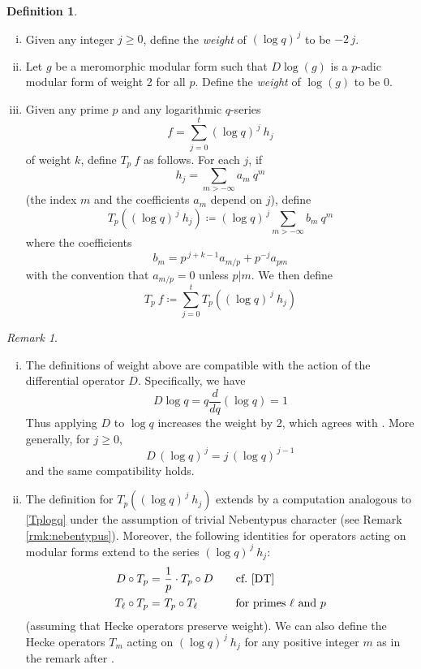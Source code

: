 \documentclass{gtpart}
\theoremstyle{definition}
\newtheorem{defn}[thm]{Definition}
\theoremstyle{remark}
\newtheorem{rmk}[thm]{Remark}
\newcommand{\ce}{\coloneqq}
\renewcommand{\=}{\approx}
\renewcommand{\-}{\sim}
\numberwithin{equation}{section}
\numberwithin{thm}{section}
\begin{document}
\begin{defn}
 \label{def:logq}
 \mbox{}
 \begin{enumerate}[(i)]
  \item Given any integer $j \geq 0$, define the {\em weight} of 
  $(\log q)^{\,j}$ to be $-2\,j$.  

  \item \label{ii} Let $g$ be a meromorphic modular form such that $D \log(g)$ 
  is a $p$-adic modular form of weight 2 for all $p$.  Define the {\em weight} 
  of $\log(g)$ to be 0.  

  \item \label{iii} Given any prime $p$ and any logarithmic $q$-series 
  \[
   f = \sum_{j = 0}^t (\log q)^{\,j} ~\! h_j 
  \]
  of weight $k$, define $T_p~f$ as follows.  For each $j$, if 
  \[
   h_j = \sum_{m > -\infty} a_m ~\! q^m 
  \]
  (the index $m$ and the coefficients $a_m$ depend on $j$), define 
  \[
   T_p \! \left( (\log q)^{\,j} ~\! h_j \right) \ce (\log q)^{\,j} 
   \sum_{m > -\infty} b_m ~\! q^m 
  \]
  where the coefficients 
  \[
   b_m = p^{\,j + k - 1} a_{m/p} + p^{-j} a_{p m} 
  \]
  with the convention that $a_{m/p} = 0$ unless $p|m$.  We then define 
  \[
   T_p~f \ce \sum_{j = 0}^t T_p \! \left( (\log q)^{\,j} ~\! h_j \right) 
  \]
 \end{enumerate}
\end{defn}

\begin{rmk}
 \mbox{}
 \begin{enumerate}[(i)]
  \item The definitions of weight above are compatible with the action of the 
  differential operator $D$.  Specifically, we have 
  \[
   D \log q = q \frac{d}{dq} (\log q) = 1 
  \]
  Thus applying $D$ to $\log q$ increases the weight by 2, which agrees with 
  \cite[Th\'eor\`eme 5\,(a)]{fmpadiq}.  More generally, for $j \geq 0$, 
  \[
   D\,(\log q)^{\,j} = j\,(\log q)^{\,j - 1} 
  \]
  and the same compatibility holds.  

  \item The definition for $T_p \! \left( (\log q)^{\,j} ~\! h_j \right)$ 
  extends \cite[Formula 1.11.1]{padicprop} by a computation analogous to 
  \eqref{Tplogq} under the assumption of trivial Nebentypus character (see 
  Remark \ref{rmk:nebentypus}).  Moreover, the following identities for 
  operators acting on modular forms extend to the series 
  $(\log q)^{\,j} ~\! h_j$: 
  \begin{equation*}
   \begin{split}
         D \circ T_p = & ~ \frac{1}{p} \cdot T_p \circ D \qquad 
                       \text{cf.~\eqref{DT}} \\
    T_\ell \circ T_p = & ~ T_p \circ T_\ell \qquad\quad~ \text{for primes $\ell$ 
                       and $p$} 
   \end{split}
  \end{equation*}
  (assuming that Hecke operators preserve weight).  We can also define the Hecke 
  operators $T_m$ acting on $(\log q)^{\,j} ~\! h_j$ for any positive integer 
  $m$ as in the remark after \cite[Th\'eor\`eme 4]{fmpadiq}.  
 \end{enumerate}
\end{rmk}
\end{document}
